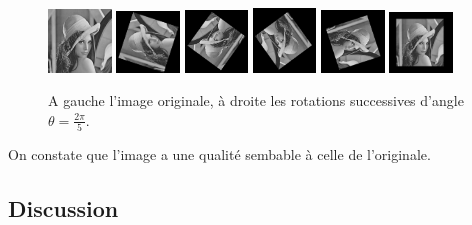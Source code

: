 \documentclass[12pt]{article}
\begin{document}
\begin{figure}[h]
	\includegraphics[width=0.15\textwidth]{lena.png}
	\includegraphics[width=0.15\textwidth]{rotation_2pi_1.png}
	\includegraphics[width=0.15\textwidth]{rotation_2pi_2.png}
	\includegraphics[width=0.15\textwidth]{rotation_2pi_3.png}
	\includegraphics[width=0.15\textwidth]{rotation_2pi_4.png}
	\includegraphics[width=0.15\textwidth]{rotation_2pi_5.png}
  \caption{A gauche l'image originale, à droite les rotations successives d'angle $\theta = \frac{2\pi}{5}$.}
\end{figure}

On constate que l'image a une qualité sembable à celle de l'originale. 

\subsection{Discussion}
\end{document}
